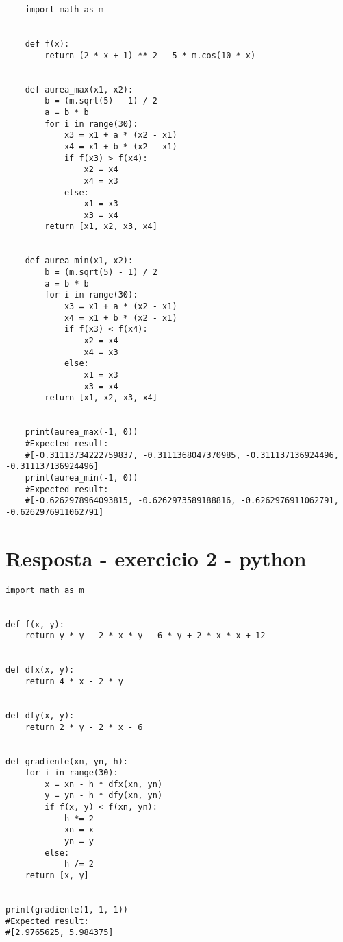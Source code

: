 \documentclass{article}
\begin{document}
\begin{lstlisting}
    import math as m


    def f(x):
        return (2 * x + 1) ** 2 - 5 * m.cos(10 * x)
    
    
    def aurea_max(x1, x2):
        b = (m.sqrt(5) - 1) / 2
        a = b * b
        for i in range(30):
            x3 = x1 + a * (x2 - x1)
            x4 = x1 + b * (x2 - x1)
            if f(x3) > f(x4):
                x2 = x4
                x4 = x3
            else:
                x1 = x3
                x3 = x4
        return [x1, x2, x3, x4]
    
    
    def aurea_min(x1, x2):
        b = (m.sqrt(5) - 1) / 2
        a = b * b
        for i in range(30):
            x3 = x1 + a * (x2 - x1)
            x4 = x1 + b * (x2 - x1)
            if f(x3) < f(x4):
                x2 = x4
                x4 = x3
            else:
                x1 = x3
                x3 = x4
        return [x1, x2, x3, x4]
    
    
    print(aurea_max(-1, 0))
    #Expected result:
    #[-0.31113734222759837, -0.3111368047370985, -0.311137136924496, -0.311137136924496]
    print(aurea_min(-1, 0))
    #Expected result: 
    #[-0.6262978964093815, -0.6262973589188816, -0.6262976911062791, -0.6262976911062791]
\end{lstlisting}

\newpage

\section{Resposta - exercicio 2 - python}
\begin{lstlisting}
import math as m


def f(x, y):
    return y * y - 2 * x * y - 6 * y + 2 * x * x + 12


def dfx(x, y):
    return 4 * x - 2 * y


def dfy(x, y):
    return 2 * y - 2 * x - 6


def gradiente(xn, yn, h):
    for i in range(30):
        x = xn - h * dfx(xn, yn)
        y = yn - h * dfy(xn, yn)
        if f(x, y) < f(xn, yn):
            h *= 2
            xn = x
            yn = y
        else:
            h /= 2
    return [x, y]


print(gradiente(1, 1, 1))
#Expected result: 
#[2.9765625, 5.984375]
\end{lstlisting}
\newpage
\end{document}
